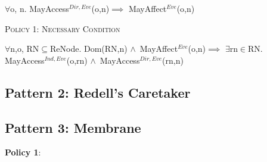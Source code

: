 \documentclass[a4paper,11pt, twoside,twocolumn]{article}
\newenvironment{logic}[1][null]
{\begin{flushleft} \small \label{#1}}
{\end{flushleft}}
\newcommand{\loin}{$\in$}
\newcommand{\loforall}{$\forall$}
\newcommand{\loexists}{$\exists$}
\newcommand{\loand}{$\land$}
\newcommand{\losubseteq}{$\subseteq$}
\newcommand{\loimplies}{$\implies$}
\newcommand{\ablock} {\null\qquad}
\begin{document}
\begin{logic}[DomP1]
\loforall o, n. MayAccess$^{Dir,Eve}$(o,n)\linebreak \ablock\ablock \loimplies \linebreak
\ablock \ablock MayAffect$^{Eve}$(o,n)\linebreak
\end{logic}
\textsc{Policy 1: Necessary Condition}
\begin{logic}[NodeP1]
\loforall n,o, RN\losubseteq ReNode.\linebreak
Dom(RN,n) \loand\ MayAffect$^{Eve}$(o,n)\linebreak \ablock\loimplies \linebreak
\ablock \loexists rn\loin RN. MayAccess$^{Ind,Eve}$(o,rn)\linebreak
\ablock \ablock \ablock\loand\ MayAccess$^{Dir,Eve}$(rn,n)
\end{logic}



\subsection{Pattern 2: Redell's Caretaker}
\subsection{Pattern 3: Membrane}




\textbf{Policy 1}:




\small



\end{document}
